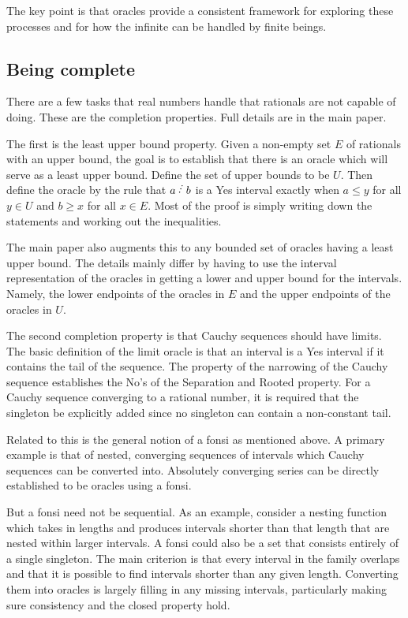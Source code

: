 \documentclass[12pt]{article}
\begin{document}
The key point is that oracles provide a consistent framework for exploring these processes and for  how the infinite can be handled by finite beings.

\subsection{Being complete}

There are a few tasks that real numbers handle that rationals are not capable of doing. These are the completion properties. Full details are in the main paper.

The first is the least upper bound property. Given a non-empty set $E$ of rationals with an upper bound, the goal is  to establish that there is an oracle which will serve as a least upper bound. Define the set of upper bounds to be $U$. Then define the oracle by the rule that $a\lte b$ is a Yes interval exactly when $a\leq y$ for all $y \in U$ and $b\geq x$ for all $x\in E$. Most of the proof is simply writing down the statements and working out the inequalities. 

The main paper also augments this to any bounded set of oracles having a least upper bound. The details mainly differ by having to use the interval representation of the oracles in getting a lower and upper bound for the intervals. Namely, the lower endpoints of the oracles in $E$ and the upper endpoints of the oracles in $U$. 

The second completion property is that Cauchy sequences should have limits. The basic definition of the limit oracle is that an interval is a Yes interval if it contains the tail of the sequence. The property of the narrowing of the Cauchy sequence establishes the No's of the Separation and Rooted property. For a Cauchy sequence converging to a rational number, it is required that the singleton be explicitly added since no singleton can contain a non-constant tail.

Related to this is the general notion of a fonsi as mentioned above. A primary example is that of nested, converging sequences of intervals which Cauchy sequences can be converted into. Absolutely converging series can be directly established to be oracles using a fonsi. 

But a fonsi need not be sequential. As an example, consider a nesting function which takes in lengths and produces intervals shorter than that length that are nested within larger intervals. A fonsi could also be a set that consists entirely of a single singleton. The main criterion is that every interval in the family overlaps and that it is possible to find intervals shorter than any given length. Converting them into oracles is largely filling in any missing intervals, particularly making sure consistency and the closed property hold.  
\end{document}
